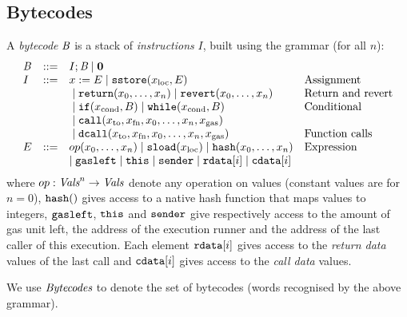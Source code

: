 \documentclass[12pt]{extarticle}
\begin{document}
\subsection{Bytecodes}
A \emph{bytecode} $\textit{B}$ is a stack of \emph{instructions} $I$, built using the grammar (for all $n$):
$$\begin{array}{lcll}
\textit{B} &:: =& I ; \textit{B} \mid \mathbf{0} \\
I & :: =& x:=E \mid \mathtt{sstore}(x_\textrm{loc},E) & \hbox{Assignment} \\
&&{}\mid \mathtt{return}(x_0,\dots,x_n) \mid \mathtt{revert}(x_0,\dots,x_n) & \hbox{Return and revert} \\
&& {}\mid \mathtt{if}(x_\textrm{cond}, B) \mid \mathtt{while}(x_\textrm{cond},B)  & \hbox{Conditional}\\
&&{}\mid \mathtt{call}(x_\textrm{to}, x_\textrm{fn}, x_0, \dots, x_n,x_\textrm{gas})\\
&&{}\mid \mathtt{dcall}(x_\textrm{to}, x_\textrm{fn}, x_0, \dots, x_n,x_\textrm{gas})
 & \hbox{Function calls} \\
E & ::= & op(x_0,\dots,x_n)\mid \mathtt{sload}(x_\textrm{loc})\mid\mathtt{hash}(x_0,\dots,x_n) & \hbox{Expression} \\ 
&& \mid \texttt{gasleft} \mid \texttt{this} \mid \mathtt{sender}\mid \mathtt{rdata}[i] \mid\mathtt{cdata}[i] 
\end{array}
$$
where $op:\textit{Vals}^n\to \textit{Vals}$ denote any operation on values (constant values are for $n=0$), $\mathtt{hash}()$ gives access to a native hash function that maps values to integers, 
$\texttt{gasleft}$, $\texttt{this}$ and $\texttt{sender}$ give respectively access to the amount of gas unit left, the address of the execution runner and the address of the last caller of this execution. 
Each element $\mathtt{rdata}[i]$ gives access to the \emph{return data} values of the last call and 
$\mathtt{cdata}[i]$ gives access to the \emph{call data} values.

We use $\textit{Bytecodes}$ to denote the set of bytecodes (words recognised by the above grammar).


\end{document}

